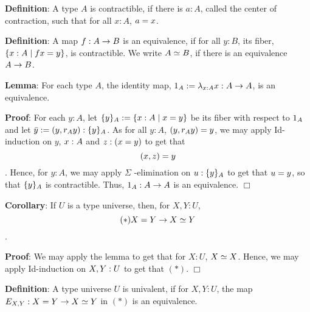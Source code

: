 \documentclass{article}
\begin{document}
 
 
 \textbf{Definition}:
 A type $A$ is contractible, if there is $a : A$, called the center of contraction, such that for all $x : A$, $a = x$.
 
 \textbf{Definition}:
 A map $f : A \rightarrow B$ is an equivalence, if for all $y : B$, its fiber, $\{ x : A \mid f x = y \}$, is contractible.
 We write $A \simeq B$, if there is an equivalence $A \rightarrow B$.
 
 \textbf{Lemma}:
 For each type $A$, the identity map, $1_{ A } := \lambda_{x : A} x : A \rightarrow A$, is an equivalence.
 
 \textbf{Proof}:
 For each $y : A$, let $\{ y \}_{ A } := \{ x : A \mid x = y \}$ be its fiber with respect to $1_{ A }$ and let $\bar{ y } := ( y , r_{ A } y ) : \{ y \}_{ A }$.
 As for all $y : A$, $( y , r_{ A } y ) = y$, we may apply Id-induction on $y$, $x : A$ and $z : ( x = y )$ to get that \[( x , z ) = y\].
 Hence, for $y : A$, we may apply $\Sigma$ -elimination on $u : \{ y \}_{ A }$ to get that $u = y$, so that $\{ y \}_{ A }$ is contractible.
 Thus, $1_{ A } : A \rightarrow A$ is an equivalence.
  $\Box$ 
 
 \textbf{Corollary}:
 If $U$ is a type universe, then, for $X , Y : U$, \[(*)X = Y \rightarrow X \simeq Y\].
 
 \textbf{Proof}:
 We may apply the lemma to get that for $X : U$, $X \simeq X$.
 Hence, we may apply Id-induction on $X , Y : U$ to get that $(*)$.
  $\Box$ 
 
 
 \textbf{Definition}:
 A type universe $U$ is univalent, if for $X , Y : U$, the map $E_ { X , Y }: X = Y \rightarrow X \simeq Y$ in $(*)$ is an equivalence.
 
 
\end{document}
